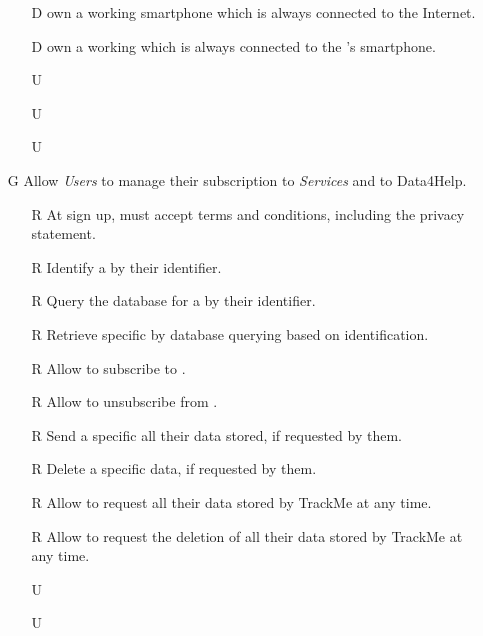 \documentclass[../../rasd.tex]{subfiles}
\begin{document}
\begin{itemize}
\begin{itemize}
                \item[D\subs{10}] own a working smartphone which is always connected to the Internet.
                \item[D\subs{11}] own a working  which is always connected to the 's smartphone.
                \\
                \item[U\subs{7}] 
                \item[U\subs{8}] 
                \item[U\subs{10}] 
            \end{itemize}

            \item[G\subs{5}]Allow \textit{Users} to manage their subscription to \textit{Services} and to Data4Help.
            \begin{itemize}
                \item[R\subs{4}]At sign up,  must accept terms and conditions, including the privacy statement.
                \item[R\subs{6}]Identify a  by their identifier.
                \item[R\subs{7}]Query the database for a  by their identifier.
                \item[R\subs{12}]Retrieve specific  by database querying based on  identification.
                \item[R\subs{30}]Allow  to subscribe to .
                \item[R\subs{31}]Allow  to unsubscribe from .
                \item[R\subs{32}]Send a specific  all their data stored, if requested by them.
                \item[R\subs{33}]Delete a  specific data, if requested by them.
                \item[R\subs{34}]Allow  to request all their data stored by TrackMe at any time.
                \item[R\subs{35}]Allow  to request the deletion of all their data stored by TrackMe at any time.
                \\
                \item[U\subs{9}] 
                \item[U\subs{10}] 
            \end{itemize}
        \end{itemize}
\end{document}
